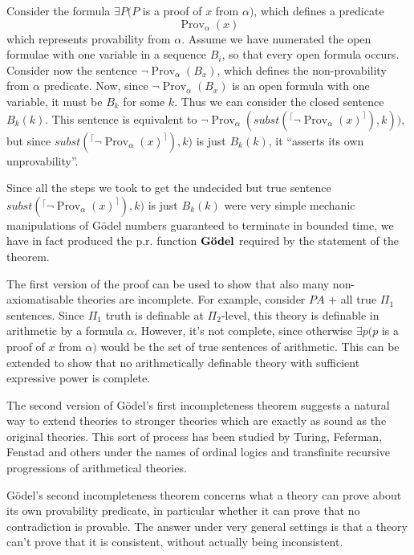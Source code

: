 \documentclass[12pt]{article}
\def\Godel{\hbox{\bf G\"odel}}
\def\Prov{\operatorname{Prov}} %
\begin{document}
Consider the formula $\exists P (P$ is a proof of $x$ from $\alpha)$, 
which defines a predicate $$\Prov_\alpha(x)$$ which represents provability from $\alpha$. 
Assume we have numerated the open formulae with one variable in a sequence $B_i$, so that every open formula occurs. 
Consider now the sentence $\neg\Prov_\alpha(B_x)$, which defines the non-provability from $\alpha$ predicate.  
Now, since $\neg\Prov_\alpha(B_x)$ is an open formula with one variable, it must be $B_k$ for some $k$. Thus we can consider the closed sentence $B_k(k)$. 
This sentence is equivalent to 
$\neg\Prov_\alpha(subst(^\lceil\neg\Prov_\alpha(x)^\rceil),k))$,
but since $subst(^\lceil\neg\Prov_\alpha(x)^\rceil),k)$ is just $B_k(k)$, 
it ``asserts its own unprovability''. 

Since all the steps we took to get the undecided but true sentence $subst(^\lceil\neg\Prov_\alpha(x)^\rceil),k)$ is just $B_k(k)$ were very simple mechanic manipulations of G\"odel numbers guaranteed to terminate in bounded time, we have in fact produced the p.r. function $\Godel$ required by the statement of the theorem.

The first version of the proof can be used to show that also many non-axiomatisable theories are incomplete. For example, consider $PA$ + all true $\Pi_1$ sentences. Since $\Pi_1$ truth is definable at $\Pi_2$-level, this theory is definable in arithmetic by a formula $\alpha$. However, it's not complete, since otherwise $\exists p (p$ is a proof of $x$ from $\alpha)$ would be the set of true sentences of arithmetic. This can be extended to show that no arithmetically definable theory with sufficient expressive power is complete.

The second version of G\"odel's first incompleteness theorem suggests a natural way to extend theories to stronger theories which are exactly as sound as the original theories. This sort of process has been studied by Turing, Feferman, Fenstad and others under the names of ordinal logics and transfinite recursive progressions of arithmetical theories.

G\"odel's second incompleteness theorem concerns what a theory can prove about its own provability predicate, in particular whether it can prove that no contradiction is provable. The answer under very general settings is that a theory can't prove that it is consistent, without actually being inconsistent. 
\end{document}
